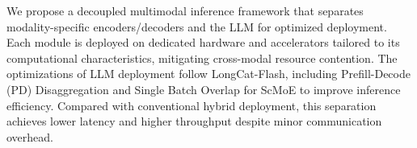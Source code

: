 \documentclass{article}
\begin{document}

We propose a decoupled multimodal inference framework that separates modality-specific encoders/decoders and the LLM for optimized deployment. Each module is deployed on dedicated hardware and accelerators tailored to its computational characteristics, mitigating cross-modal resource contention. The optimizations of LLM deployment follow LongCat-Flash, including Prefill-Decode (PD) Disaggregation and Single Batch Overlap for ScMoE to improve inference efficiency. 
Compared with conventional hybrid deployment, this separation achieves lower latency and higher throughput despite minor communication overhead.



\end{document}
